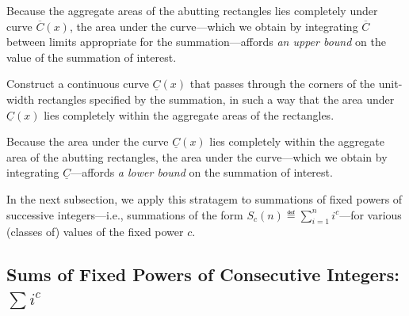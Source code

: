 \noindent {}

Because the aggregate areas of the abutting rectangles lies completely
under curve $\overline{C}(x)$, the area under the curve---which we
obtain by integrating $\overline{C}$ between limits appropriate for
the summation---affords {\em an upper bound} on the value of the
summation of interest.

\medskip

%
Construct a continuous curve $\underline{C}(x)$ that passes through
the corners of the unit-width rectangles
specified by the summation, in such a way that the area under
$\underline{C}(x)$ lies completely within the aggregate areas of the 
rectangles.
\medskip

\noindent {}
\bigskip

Because the area under the curve $\underline{C}(x)$ lies completely
within the aggregate area of the abutting rectangles, the area under
the curve---which we obtain by integrating $\underline{C}$---affords
{\em a lower bound} on the summation of interest.

\medskip

In the next subsection, we apply this stratagem to summations of fixed
powers of successive integers---i.e., summations of the form
$\displaystyle S_c(n) \eqdef \sum_{i=1}^n i^c$---for various (classes
of) values of the fixed power $c$.


\subsection{Sums of Fixed Powers of Consecutive Integers: $\sum i^c$}
\label{sec:sum-of-i2c}

